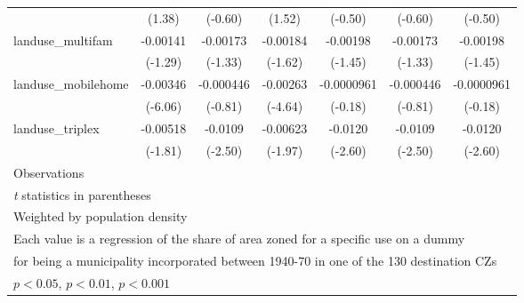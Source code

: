 \begin{table}[htbp]
\begin{tabular}{l*{6}{c}}
                    &      (1.38)         &     (-0.60)         &      (1.52)         &     (-0.50)         &     (-0.60)         &     (-0.50)         \\
\addlinespace
landuse\_multifam    &    -0.00141         &    -0.00173         &    -0.00184         &    -0.00198         &    -0.00173         &    -0.00198         \\
                    &     (-1.29)         &     (-1.33)         &     (-1.62)         &     (-1.45)         &     (-1.33)         &     (-1.45)         \\
\addlinespace
landuse\_mobilehome  &    -0.00346\sym{***}&   -0.000446         &    -0.00263\sym{***}&  -0.0000961         &   -0.000446         &  -0.0000961         \\
                    &     (-6.06)         &     (-0.81)         &     (-4.64)         &     (-0.18)         &     (-0.81)         &     (-0.18)         \\
\addlinespace
landuse\_triplex     &    -0.00518         &     -0.0109\sym{*}  &    -0.00623\sym{*}  &     -0.0120\sym{**} &     -0.0109\sym{*}  &     -0.0120\sym{**} \\
                    &     (-1.81)         &     (-2.50)         &     (-1.97)         &     (-2.60)         &     (-2.50)         &     (-2.60)         \\
\midrule
Observations        &                     &                     &                     &                     &                     &                     \\
\bottomrule
\multicolumn{7}{l}{\footnotesize \textit{t} statistics in parentheses}\\
\multicolumn{7}{l}{\footnotesize Weighted by population density}\\
\multicolumn{7}{l}{\footnotesize Each value is a regression of the share of area zoned for a specific use on a dummy}\\
\multicolumn{7}{l}{\footnotesize for being a municipality incorporated between 1940-70 in one of the 130 destination CZs}\\
\multicolumn{7}{l}{\footnotesize \sym{*} \(p<0.05\), \sym{**} \(p<0.01\), \sym{***} \(p<0.001\)}\\
\end{tabular}
\end{table}
